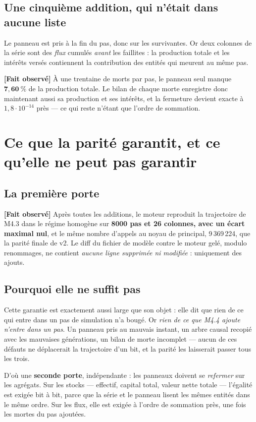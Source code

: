 \documentclass[11pt,a4paper]{article}
\newcommand{\fait}{\textbf{[Fait observé]}}
\begin{document}
\subsection{Une cinquième addition, qui n'était dans aucune liste}

Le panneau est pris à la fin du pas, donc sur les survivantes. Or deux
colonnes de la série sont des \emph{flux} cumulés \emph{avant} les faillites :
la production totale et les intérêts versés contiennent la contribution des
entités qui meurent au même pas.

\fait{} À une trentaine de morts par pas, le panneau seul manque
$\mathbf{7{,}60~\%}$ de la production totale. Le bilan de chaque morte
enregistre donc maintenant aussi sa production et ses intérêts, et la
fermeture devient exacte à $1{,}8\cdot10^{-14}$ près --- ce qui reste n'étant
que l'ordre de sommation.

\section{Ce que la parité garantit, et ce qu'elle ne peut pas garantir}

\subsection{La première porte}

\fait{} Après toutes les additions, le moteur reproduit la trajectoire de
M4.3 dans le régime homogène sur \textbf{8000 pas et 26 colonnes, avec un
écart maximal nul}, et le même nombre d'appels au noyau de principal,
9\,369\,224, que la parité finale de v2. Le diff du fichier de modèle contre
le moteur gelé, modulo renommages, ne contient \emph{aucune ligne supprimée
ni modifiée} : uniquement des ajouts.

\subsection{Pourquoi elle ne suffit pas}

Cette garantie est exactement aussi large que son objet : elle dit que rien
de ce qui entre dans un pas de simulation n'a bougé. Or \emph{rien de ce que
M4.4 ajoute n'entre dans un pas}. Un panneau pris au mauvais instant, un
arbre causal recopié avec les mauvaises générations, un bilan de morte
incomplet --- aucun de ces défauts ne déplacerait la trajectoire d'un bit, et
la parité les laisserait passer tous les trois.

D'où une \textbf{seconde porte}, indépendante : les panneaux doivent se
\emph{refermer} sur les agrégats. Sur les stocks --- effectif, capital total,
valeur nette totale --- l'égalité est exigée bit à bit, parce que la série et
le panneau lisent les mêmes entités dans le même ordre. Sur les flux, elle
est exigée à l'ordre de sommation près, une fois les mortes du pas ajoutées.
\end{document}
